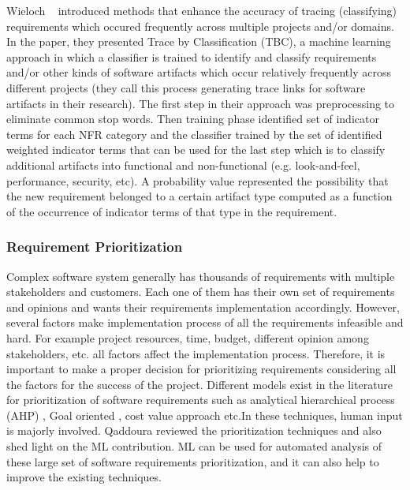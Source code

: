 Wieloch \etal~\cite{Wieloch:2013} introduced methods that enhance the accuracy
of tracing (classifying) requirements which occured frequently across multiple
projects and/or domains. In the paper, they presented Trace by  Classification
(TBC),  a machine learning approach in which a classifier is trained to identify
and classify requirements and/or other kinds of software artifacts which occur
relatively frequently across different projects (they call this process
generating trace links for software artifacts in their research). The first step
in their approach was preprocessing to eliminate common stop words.
Then training phase identified set of indicator terms for each NFR category and the classifier trained by the set of identified
weighted indicator terms that can be used for the last step which is to
classify additional artifacts into functional and non-functional (e.g.
look-and-feel, performance, security, etc). A probability value represented the
possibility that the new requirement belonged to a certain artifact type
computed as a function of the occurrence of indicator terms of that type in the
requirement.\\

\subsubsection{Requirement Prioritization}
Complex software system generally has thousands of requirements with multiple
stakeholders and customers. Each one of them has their own set of requirements
and opinions and wants their requirements implementation accordingly. However,
several factors make implementation process of all the requirements infeasible
and hard. For example project resources, time, budget, different opinion among
stakeholders, etc. all factors affect the implementation process. Therefore, it
is important to make a proper decision for prioritizing requirements considering
all the factors for the success of the project. Different models exist in the
literature for prioritization of software requirements such as analytical
hierarchical process (AHP) \cite{saaty2008}, Goal oriented
\cite{VanLamsweerde:2001}, cost value approach \cite{Karlsson:1997} etc.In these
techniques, human input is majorly involved. Qaddoura \etal \cite{RQaddoura}
reviewed the prioritization techniques and also shed light on the ML
contribution. ML can be used for automated analysis of these large set of
software requirements prioritization, and it can also help to improve the existing techniques.

